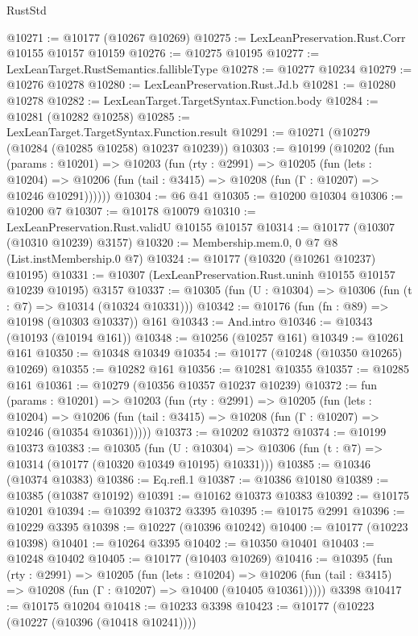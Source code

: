 \begin{lexlean}{RustStd}
\begin{coremodule}
@10271 := @10177 (@10267 @10269)
@10275 := LexLeanPreservation.Rust.Corr @10155 @10157 @10159
@10276 := @10275 @10195
@10277 := LexLeanTarget.RustSemantics.fallibleType
@10278 := @10277 @10234
@10279 := @10276 @10278
@10280 := LexLeanPreservation.Rust.Jd.b
@10281 := @10280 @10278
@10282 := LexLeanTarget.TargetSyntax.Function.body
@10284 := @10281 (@10282 @10258)
@10285 := LexLeanTarget.TargetSyntax.Function.result
@10291 := @10271 (@10279 (@10284 (@10285 @10258) @10237 @10239))
@10303 := @10199
    (@10202
      (fun (params : @10201) =>
      @10203
        (fun (rty : @2991) =>
        @10205
          (fun (lets : @10204) =>
          @10206 (fun (tail : @3415) => @10208 (fun (Γ : @10207) => @10246 @10291))))))
@10304 := @6 @41
@10305 := @10200 @10304
@10306 := @10200 @7
@10307 := @10178 @10079
@10310 := LexLeanPreservation.Rust.validU @10155 @10157
@10314 := @10177 (@10307 (@10310 @10239) @3157)
@10320 := Membership.mem.{0, 0} @7 @8 (List.instMembership.{0} @7)
@10324 := @10177 (@10320 (@10261 @10237) @10195)
@10331 := @10307 (LexLeanPreservation.Rust.uninh @10155 @10157 @10239 @10195) @3157
@10337 := @10305 (fun (U : @10304) => @10306 (fun (t : @7) => @10314 (@10324 @10331)))
@10342 := @10176 (fun (fn : @89) => @10198 (@10303 @10337)) @161
@10343 := And.intro
@10346 := @10343 (@10193 (@10194 @161))
@10348 := @10256 (@10257 @161)
@10349 := @10261 @161
@10350 := @10348 @10349
@10354 := @10177 (@10248 (@10350 @10265) @10269)
@10355 := @10282 @161
@10356 := @10281 @10355
@10357 := @10285 @161
@10361 := @10279 (@10356 @10357 @10237 @10239)
@10372 := fun (params : @10201) =>
  @10203
    (fun (rty : @2991) =>
    @10205
      (fun (lets : @10204) =>
      @10206 (fun (tail : @3415) => @10208 (fun (Γ : @10207) => @10246 (@10354 @10361)))))
@10373 := @10202 @10372
@10374 := @10199 @10373
@10383 := @10305
    (fun (U : @10304) => @10306 (fun (t : @7) => @10314 (@10177 (@10320 @10349 @10195) @10331)))
@10385 := @10346 (@10374 @10383)
@10386 := Eq.refl.{1}
@10387 := @10386 @10180
@10389 := @10385 (@10387 @10192)
@10391 := @10162 @10373 @10383
@10392 := @10175 @10201
@10394 := @10392 @10372 @3395
@10395 := @10175 @2991
@10396 := @10229 @3395
@10398 := @10227 (@10396 @10242)
@10400 := @10177 (@10223 @10398)
@10401 := @10264 @3395
@10402 := @10350 @10401
@10403 := @10248 @10402
@10405 := @10177 (@10403 @10269)
@10416 := @10395
    (fun (rty : @2991) =>
    @10205
      (fun (lets : @10204) =>
      @10206 (fun (tail : @3415) => @10208 (fun (Γ : @10207) => @10400 (@10405 @10361)))))
    @3398
@10417 := @10175 @10204
@10418 := @10233 @3398
@10423 := @10177 (@10223 (@10227 (@10396 (@10418 @10241))))

\end{coremodule}
\end{lexlean}
